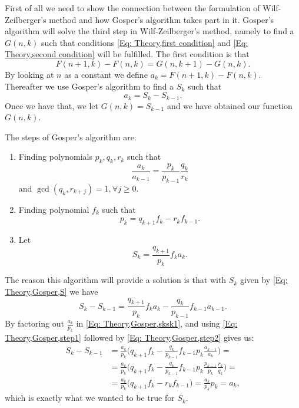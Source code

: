 First of all we need to show the connection between the formulation of Wilf-Zeilberger's method and how Gosper's algorithm takes part in it. Gosper's algorithm will solve the third step in Wilf-Zeilberger's method, namely to find a $G(n,k)$ such that conditions \eqref{Eq: Theory,first condition} and \eqref{Eq: Theory,second condition} will be fulfilled. The first condition is that
\begin{equation}
  F(n+1,k)-F(n,k) = G(n,k+1)-G(n,k).
\end{equation}
By looking at $n$ as a constant we define $a_k=F(n+1,k)-F(n,k)$. Thereafter we use Gosper's algorithm to find a $S_k$ such that
\begin{equation}
  a_k = S_k-S_{k-1}.
\end{equation}
Once we have that, we let $G(n,k) = S_{k-1}$ and we have obtained our function $G(n,k)$.

The steps of Gosper's algorithm are:
\begin{enumerate}
  \item Finding polynomials $p_k,q_k,r_k$ such that
  \begin{equation}\label{Eq: Theory,Gosper,step1}
    \frac{a_k}{a_{k-1}} = \frac{p_k}{p_{k-1}}\frac{q_k}{r_k}
  \end{equation}
  and $\gcd(q_k,r_{k+j})=1, \forall j\geq 0$.
  \item Finding polynomial $f_k$ such that
  \begin{equation}\label{Eq: Theory,Gosper,step2}
    p_k=q_{k+1}f_k-r_kf_{k-1}.
  \end{equation}
  \item Let
  \begin{equation}\label{Eq: Theory,Gosper,S}
    S_k=\frac{q_{k+1}}{p_k}f_ka_k.
  \end{equation}
\end{enumerate}
The reason this algorithm will provide a solution is that with $S_k$ given by \eqref{Eq: Theory,Gosper,S} we have
\begin{equation}\label{Eq: Theory,Gosper,sksk1}
  S_k-S_{k-1} = \frac{q_{k+1}}{p_k}f_ka_k-\frac{q_{k}}{p_{k-1}}f_{k-1}a_{k-1}.
\end{equation}
By factoring out $\frac{a_k}{p_k}$ in \eqref{Eq: Theory,Gosper,sksk1}, and using \eqref{Eq: Theory,Gosper,step1} followed by \eqref{Eq: Theory,Gosper,step2} gives us:
\begin{equation}
  \begin{split}
    S_k-S_{k-1} & = \frac{a_k}{p_k}\Big(q_{k+1}f_k-\frac{q_k}{p_{k-1}}f_{k-1}p_k\frac{a_{k-1}}{a_k}\Big) = \\
    & =\frac{a_k}{p_k}\Big(q_{k+1}f_k-\frac{q_k}{p_{k-1}}f_{k-1}p_k\frac{p_{k-1}}{p_k}\frac{r_k}{q_k}\Big)= \\
    & = \frac{a_k}{p_k}\Big(q_{k+1}f_k-r_kf_{k-1}\Big) = \frac{a_k}{p_k}p_k = a_k,
  \end{split}
\end{equation}
which is exactly what we wanted to be true for $S_k$.

